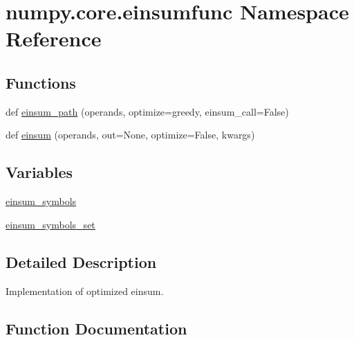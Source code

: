 \hypertarget{namespacenumpy_1_1core_1_1einsumfunc}{}\section{numpy.\+core.\+einsumfunc Namespace Reference}
\label{namespacenumpy_1_1core_1_1einsumfunc}
\subsection*{Functions}
\begin{DoxyCompactItemize}
\item 
def \hyperlink{namespacenumpy_1_1core_1_1einsumfunc_a629e5a8c16112e405719b3d5cf8b859c}{einsum\+\_\+path} (operands, optimize=\textquotesingle{}greedy\textquotesingle{}, einsum\+\_\+call=False)
\item 
def \hyperlink{namespacenumpy_1_1core_1_1einsumfunc_a8212ba2fbebf5f0622ea31bf48fbe472}{einsum} (operands, out=None, optimize=False, kwargs)
\end{DoxyCompactItemize}
\subsection*{Variables}
\begin{DoxyCompactItemize}
\item 
\hyperlink{namespacenumpy_1_1core_1_1einsumfunc_ad932513c04deddd5dd21f9797d629a3c}{einsum\+\_\+symbols}
\item 
\hyperlink{namespacenumpy_1_1core_1_1einsumfunc_ae9434bd5793781fc806f488c58228d32}{einsum\+\_\+symbols\+\_\+set}
\end{DoxyCompactItemize}


\subsection{Detailed Description}
\begin{DoxyVerb}Implementation of optimized einsum.\end{DoxyVerb}
 

\subsection{Function Documentation}
\mbox{\label{namespacenumpy_1_1core_1_1einsumfunc_a8212ba2fbebf5f0622ea31bf48fbe472}} 
